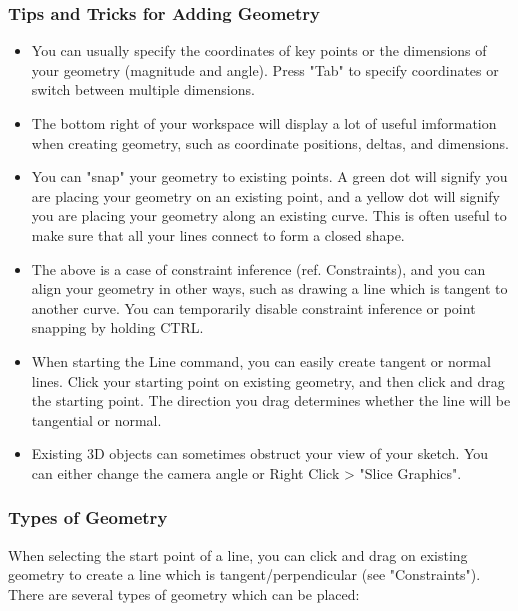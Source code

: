 \subsubsection{Tips and Tricks for Adding Geometry}
\begin{itemize}
    \item You can usually specify the coordinates of key points or the dimensions of your geometry (magnitude and angle). Press "Tab" to specify coordinates or switch between multiple dimensions.
    \item The bottom right of your workspace will display a lot of useful imformation when creating geometry, such as coordinate positions, deltas, and dimensions.
    \item You can "snap" your geometry to existing points. A green dot will signify you are placing your geometry on an existing point, and a yellow dot will signify you are placing your geometry along an existing curve. This is often useful to make sure that all your lines connect to form a closed shape.
    \item The above is a case of constraint inference (ref. Constraints), and you can align your geometry in other ways, such as drawing a line which is tangent to another curve. You can temporarily disable constraint inference or point snapping by holding CTRL.
    \item When starting the Line command, you can easily create tangent or normal lines. Click your starting point on existing geometry, and then click and drag the starting point. The direction you drag determines whether the line will be tangential or normal.
    \item Existing 3D objects can sometimes obstruct your view of your sketch. You can either change the camera angle or Right Click > "Slice Graphics".
\end{itemize}

\subsubsection{Types of Geometry}

When selecting the start point of a line, you can click and drag on existing geometry to create a line which is tangent/perpendicular (see "Constraints"). There are several types of geometry which can be placed:

